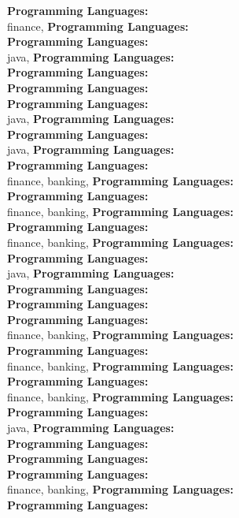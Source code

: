 \textbf{Programming Languages:} \\
finance, \textbf{Programming Languages:} \\
\textbf{Programming Languages:} \\
java, \textbf{Programming Languages:} \\
\textbf{Programming Languages:} \\
\textbf{Programming Languages:} \\
\textbf{Programming Languages:} \\
java, \textbf{Programming Languages:} \\
\textbf{Programming Languages:} \\
java, \textbf{Programming Languages:} \\
\textbf{Programming Languages:} \\
finance, banking, \textbf{Programming Languages:} \\
\textbf{Programming Languages:} \\
finance, banking, \textbf{Programming Languages:} \\
\textbf{Programming Languages:} \\
finance, banking, \textbf{Programming Languages:} \\
\textbf{Programming Languages:} \\
java, \textbf{Programming Languages:} \\
\textbf{Programming Languages:} \\
\textbf{Programming Languages:} \\
\textbf{Programming Languages:} \\
finance, banking, \textbf{Programming Languages:} \\
\textbf{Programming Languages:} \\
finance, banking, \textbf{Programming Languages:} \\
\textbf{Programming Languages:} \\
finance, banking, \textbf{Programming Languages:} \\
\textbf{Programming Languages:} \\
java, \textbf{Programming Languages:} \\
\textbf{Programming Languages:} \\
\textbf{Programming Languages:} \\
\textbf{Programming Languages:} \\
finance, banking, \textbf{Programming Languages:} \\
\textbf{Programming Languages:} \\
